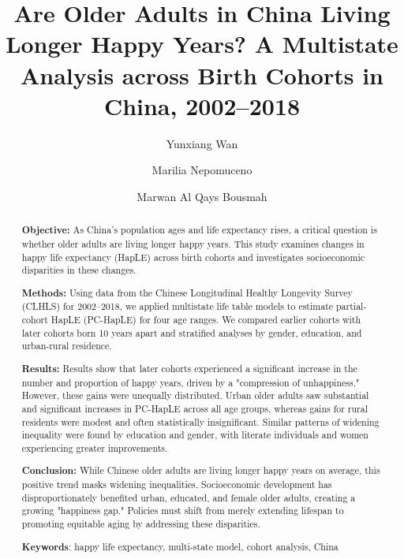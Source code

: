\documentclass[12pt, a4paper]{article}
\title{\textbf{Are Older Adults in China Living Longer Happy Years? A Multistate Analysis across Birth Cohorts in China, 2002--2018}}
\author[*]{\small Yunxiang Wan\orcidlink{0009-0003-7482-7991}}
\author[1]{\small Marilia Nepomuceno}
\author[2]{\small Marwan Al Qays Bousmah}
\affil[1]{\small{Max Planck Institute for Demographic Research, Rostock, Germany, 18057}}
\affil[2]{\small{French Institute for Demographic Studies, Paris, France, 93300}}
\affil[*]{Corresponding author: \href{mailto:wan@demogr.mpg.de}{wan@demogr.mpg.de}}
\date{}
\begin{document}
\newpage

\maketitle

\begin{abstract}
  \noindent\textbf{Objective:} As China's population ages and life expectancy rises, a critical question is whether older adults are living longer happy years. This study examines changes in happy life expectancy (HapLE) across birth cohorts and investigates socioeconomic disparities in these changes.

  \noindent\textbf{Methods:} Using data from the Chinese Longitudinal Healthy Longevity Survey (CLHLS) for 2002–2018, we applied multistate life table models to estimate partial-cohort HapLE (PC-HapLE) for four age ranges. We compared earlier cohorts with later cohorts born 10 years apart and stratified analyses by gender, education, and urban-rural residence.

  \noindent\textbf{Results:} Results show that later cohorts experienced a significant increase in the number and proportion of happy years, driven by a "compression of unhappiness." However, these gains were unequally distributed. Urban older adults saw substantial and significant increases in PC-HapLE across all age groups, whereas gains for rural residents were modest and often statistically insignificant. Similar patterns of widening inequality were found by education and gender, with literate individuals and women experiencing greater improvements.

  \noindent\textbf{Conclusion:} While Chinese older adults are living longer happy years on average, this positive trend masks widening inequalities. Socioeconomic development has disproportionately benefited urban, educated, and female older adults, creating a growing "happiness gap." Policies must shift from merely extending lifespan to promoting equitable aging by addressing these disparities.
  \vspace{1em}

  \noindent\textbf{Keywords}: happy life expectancy, multi-state model, cohort analysis, China
\end{abstract}


\end{document}
